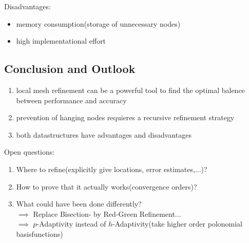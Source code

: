 Disadvantages:
\begin{itemize}
	\item memory consumption(storage of unnecessary nodes)
	\item high implementational effort
\end{itemize}

\subsection{Conclusion and Outlook}
\begin{enumerate}[label = \arabic* .]
	\item local mesh refinement can be a powerful tool to find the optimal balence between performance and accuracy
	\item prevention of hanging nodes requieres a recursive refinement strategy
	\item both datastructures have advantages and disadvantages  
\end{enumerate}
Open questions:
\begin{enumerate}[label = \arabic* .]
	\item Where to refine(explicitly give locations, error estimates,...)?
	\item How to prove that it actually works(convergence orders)?
	\item What could have been done differently?\\
	$\implies$ Replace Bisection- by Red-Green Refinement...\\
	$\implies$ $p$-Adaptivity instead of $h$-Adaptivity(take higher order polonomial basisfunctions)
\end{enumerate}


